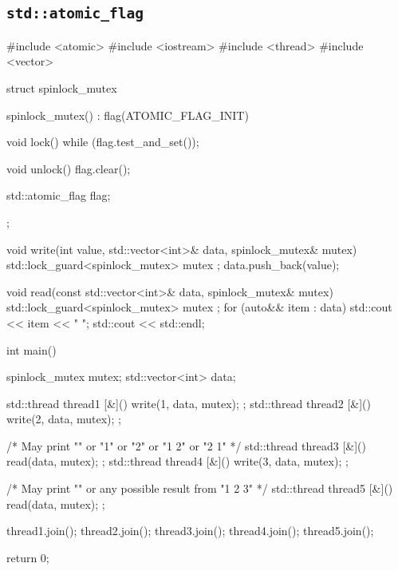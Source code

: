 \documentclass[../main]{subfiles}
\begin{document}
\subsection{\texttt{std::atomic\_flag}}
\begin{Code}
    #include <atomic>
    #include <iostream>
    #include <thread>
    #include <vector>

    struct spinlock_mutex
    {
        spinlock_mutex()
         : flag(ATOMIC_FLAG_INIT)
        {}

        void lock()
        {
           while (flag.test_and_set());
        }

        void unlock() { flag.clear(); }

        std::atomic_flag flag;
    };

    void write(int value, std::vector<int>& data, spinlock_mutex& mutex)
    {
        std::lock_guard<spinlock_mutex>{ mutex };
        data.push_back(value);
    }

    void read(const std::vector<int>& data, spinlock_mutex& mutex)
    {
        std::lock_guard<spinlock_mutex>{ mutex };
        for (auto&& item : data)
        {
           std::cout << item << " ";
        }
        std::cout << std::endl;
    }

    int main()
    {
        spinlock_mutex mutex{};
        std::vector<int> data;

        std::thread thread1{ [&]() { write(1, data, mutex); } };
        std::thread thread2{ [&]() { write(2, data, mutex); } };

        /* May print "" or "1" or "2" or "1 2" or "2 1" */
        std::thread thread3{ [&]() { read(data, mutex); } };
        std::thread thread4{ [&]() { write(3, data, mutex); } };

        /* May print "" or any possible result from "1 2 3" */
        std::thread thread5{ [&]() { read(data, mutex); } };

        thread1.join();
        thread2.join();
        thread3.join();
        thread4.join();
        thread5.join();

        return 0;
    }
\end{Code}
\end{document}
